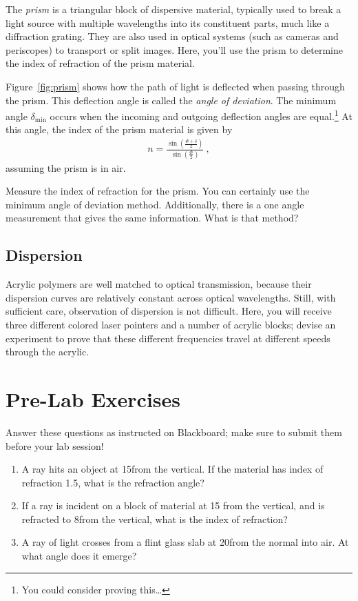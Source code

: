 \documentclass[12pt]{article}
\begin{document}
The \textit{prism} is a triangular block of dispersive material,
typically used to break a light source with multiple wavelengths into
its constituent parts, much like a diffraction grating.  They are also
used in optical systems (such as cameras and periscopes) to transport
or split images.  Here, you'll use the prism to determine the index of
refraction of the prism material.

Figure~\ref{fig:prism} shows how the path of light is deflected when
passing through the prism.  This deflection angle is called the
\textit{angle of deviation}.  The minimum angle $\delta_\mathrm{min}$
occurs when the incoming and outgoing deflection angles are
equal.\footnote{You could consider proving this\ldots} At this angle,
the index of the prism material is given by
\begin{gather*}
  n = \frac{\sin\left(\frac{\Phi+\delta}{2}\right)}
  {\sin\left(\frac{\Phi}{2}\right)}\ ,
\end{gather*}
assuming the prism is in air.

Measure the index of refraction for the prism.  You can certainly use
the minimum angle of deviation method.  Additionally, there is a one
angle measurement that gives the same information.  What is that
method?


\subsection{Dispersion}
\label{sec:dispersion}

Acrylic polymers are well matched to optical transmission, because
their dispersion curves are relatively constant across optical
wavelengths.  Still, with sufficient care, observation of dispersion
is not difficult.  Here, you will receive three different colored
laser pointers and a number of acrylic blocks; devise an experiment to
prove that these different frequencies travel at different speeds
through the acrylic.

\newpage
 
\section*{Pre-Lab Exercises}

Answer these questions as instructed on Blackboard; make sure to
submit them before your lab session!

\begin{enumerate}
\item A ray hits an object at 15\textdegree from the vertical.  If the
  material has index of refraction 1.5, what is the refraction angle?
\item If a ray is incident on a block of material at 15\textdegree
  from the vertical, and is refracted to 8\textdegree from the
  vertical, what is the index of refraction?
\item  A ray of light crosses from a flint glass slab at
  20\textdegree from the normal into air.  At what angle does it
  emerge? 
\end{enumerate}
\end{document}
